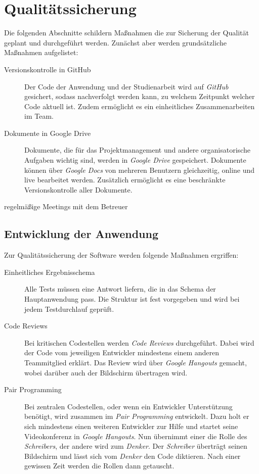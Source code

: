 \documentclass[
	pdftex,
	fontsize=12pt,          %
	DIV10,                  %
	ngerman,                %
	paper=a4,               %
	twoside=false,          %
	titlepage,              %
	parskip=half,           %
	headings=normal,        %
	listof=nochaptergap,  %
	bibliography=totoc, %
	index=totoc,            %
	captions=tableheading,  %
	final                 %
]{scrreprt}
\begin{document}
\newpage
\chapter{Qualitätssicherung}
Die folgenden Abschnitte schildern Maßnahmen die zur Sicherung der Qualität geplant und durchgeführt werden. Zunächst aber werden grundsätzliche Maßnahmen aufgelistet:

\begin{description}
	\item[Versionskontrolle in GitHub] Der Code der Anwendung und der Studienarbeit wird auf \textit{GitHub} gesichert, sodass nachverfolgt werden kann, zu welchem Zeitpunkt welcher Code aktuell ist. Zudem ermöglicht es ein einheitliches Zusammenarbeiten im Team.
	\item[Dokumente in Google Drive] Dokumente, die für das Projektmanagement und andere organisatorische Aufgaben wichtig sind, werden in \textit{Google Drive} gespeichert. Dokumente können über \textit{Google Docs} von mehreren Benutzern gleichzeitig, online und live bearbeitet werden. Zusätzlich ermöglicht es eine beschränkte Versionskontrolle aller Dokumente.
	\item[regelmäßige Meetings mit dem Betreuer] \textit{}
\end{description}

\section{Entwicklung der Anwendung}
Zur Qualitätssicherung der Software werden folgende Maßnahmen ergriffen:

\begin{description}
	\item[Einheitliches Ergebnisschema] Alle Tests müssen eine Antwort liefern, die in das Schema der Hauptanwendung pass. Die Struktur ist fest vorgegeben und wird bei jedem Testdurchlauf geprüft.
	\item[Code Reviews] Bei kritischen Codestellen werden \textit{Code Reviews} durchgeführt. Dabei wird der Code vom jeweiligen Entwickler mindestens einem anderen Teammitglied erklärt. Das Review wird über \textit{Google Hangouts} gemacht, wobei darüber auch der Bildschirm übertragen wird.
	\item[Pair Programming] Bei zentralen Codestellen, oder wenn ein Entwickler Unterstützung benötigt, wird zusammen im \textit{Pair Programming} entwickelt. Dazu holt er sich mindestens einen weiteren Entwickler zur Hilfe und startet seine Videokonferenz in \textit{Google Hangouts}. Nun übernimmt einer die Rolle des \textit{Schreibers}, der andere wird zum \textit{Denker}. Der \textit{Schreiber} überträgt seinen Bildschirm und lässt sich vom \textit{Denker} den Code diktieren. Nach einer gewissen Zeit werden die Rollen dann getauscht.
\end{description}
\end{document}
